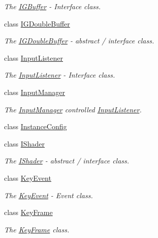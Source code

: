 \begin{DoxyCompactItemize}
\begin{DoxyCompactList}\small\item\em The \hyperlink{classEngine_1_1IGBuffer}{I\+G\+Buffer} -\/ Interface class. \end{DoxyCompactList}\item 
class \hyperlink{classEngine_1_1IGDoubleBuffer}{I\+G\+Double\+Buffer}
\begin{DoxyCompactList}\small\item\em The \hyperlink{classEngine_1_1IGDoubleBuffer}{I\+G\+Double\+Buffer} -\/ abstract / interface class. \end{DoxyCompactList}\item 
class \hyperlink{classEngine_1_1InputListener}{Input\+Listener}
\begin{DoxyCompactList}\small\item\em The \hyperlink{classEngine_1_1InputListener}{Input\+Listener} -\/ Interface class. \end{DoxyCompactList}\item 
class \hyperlink{classEngine_1_1InputManager}{Input\+Manager}
\begin{DoxyCompactList}\small\item\em The \hyperlink{classEngine_1_1InputManager}{Input\+Manager} controlled \hyperlink{classEngine_1_1InputListener}{Input\+Listener}. \end{DoxyCompactList}\item 
class \hyperlink{classEngine_1_1InstanceConfig}{Instance\+Config}
\item 
class \hyperlink{classEngine_1_1IShader}{I\+Shader}
\begin{DoxyCompactList}\small\item\em The \hyperlink{classEngine_1_1IShader}{I\+Shader} -\/ abstract / interface class. \end{DoxyCompactList}\item 
class \hyperlink{classEngine_1_1KeyEvent}{Key\+Event}
\begin{DoxyCompactList}\small\item\em The \hyperlink{classEngine_1_1KeyEvent}{Key\+Event} -\/ Event class. \end{DoxyCompactList}\item 
class \hyperlink{classEngine_1_1KeyFrame}{Key\+Frame}
\begin{DoxyCompactList}\small\item\em The \hyperlink{classEngine_1_1KeyFrame}{Key\+Frame} class. \end{DoxyCompactList}\item 

\end{DoxyCompactItemize}
